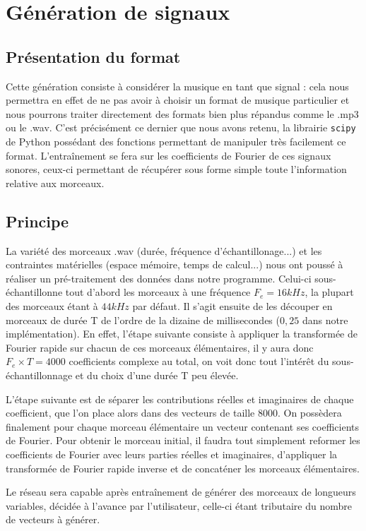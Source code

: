 \section{Génération de signaux}
\subsection{Présentation du format}
Cette génération consiste à considérer la musique en tant que signal : cela nous permettra en effet de ne pas avoir à choisir un format de musique particulier et nous pourrons traiter directement des formats bien plus répandus comme le .mp3 ou le .wav. C'est précisément ce dernier que nous avons retenu, la librairie \texttt{scipy} de Python possédant des fonctions permettant de manipuler très facilement ce format. L'entraînement se fera sur les coefficients de Fourier de ces signaux sonores, ceux-ci permettant de récupérer sous forme simple toute l'information relative aux morceaux.

\subsection{Principe}
La variété des morceaux .wav (durée, fréquence d'échantillonage...) et les contraintes matérielles (espace mémoire, temps de calcul...) nous ont poussé à réaliser un pré-traitement des données dans notre programme. Celui-ci sous-échantillonne tout d'abord les morceaux à une fréquence $F_e = 16kHz$, la plupart des morceaux étant à $44kHz$ par défaut. Il s'agit ensuite de les découper en morceaux de durée T de l'ordre de la dizaine de millisecondes ($0,25$ dans notre implémentation). En effet, l'étape suivante consiste à appliquer la transformée de Fourier rapide sur chacun de ces morceaux élémentaires, il y aura donc $F_e \times T = 4000$ coefficients complexe au total, on voit donc tout l'intérêt du sous-échantillonnage et du choix d'une durée T peu élevée. 

L'étape suivante est de séparer les contributions réelles et imaginaires de chaque coefficient, que l'on place alors dans des vecteurs de taille 8000. On possèdera finalement pour chaque morceau élémentaire un vecteur contenant ses coefficients de Fourier. Pour obtenir le morceau initial, il faudra tout simplement reformer les coefficients de Fourier avec leurs parties réelles et imaginaires, d'appliquer la transformée de Fourier rapide inverse et de concaténer les morceaux élémentaires.

Le réseau sera capable après entraînement de générer des morceaux de longueurs variables, décidée à l'avance par l'utilisateur, celle-ci étant tributaire du nombre de vecteurs à générer.

